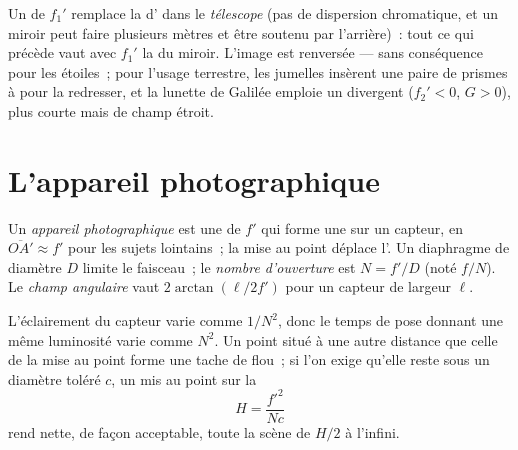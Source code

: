 \begin{remark}\label{rem:b1:optical-instruments:variants}
Un  de  $f_1'$ remplace la 
d' dans le \emph{télescope} (pas de dispersion chromatique, et
un miroir peut faire plusieurs mètres et être soutenu par l'arrière)~:
tout ce qui précède vaut avec $f_1'$ la  du miroir.
L'image est renversée --- sans conséquence pour les étoiles~; pour
l'usage terrestre, les jumelles insèrent une paire de prismes à
 pour la redresser, et la lunette de Galilée emploie un
 divergent ($f_2' < 0$, $G > 0$), plus courte mais de champ
étroit.
\end{remark}

\section{L'appareil photographique}

\begin{definition}\label{def:b1:optical-instruments:camera}
Un \emph{appareil photographique} est une  de
 $f'$ qui forme une  sur un capteur, en
$\overline{OA'} \approx f'$ pour les sujets lointains~; la mise au point
déplace l'. Un diaphragme de diamètre $D$ limite le faisceau~;
le \emph{nombre d'ouverture} est $N = f'/D$ (noté $f/N$). Le
\emph{champ angulaire} vaut $2\arctan(\ell/2f')$ pour un capteur de
largeur $\ell$.
\end{definition}

\begin{proposition}\label{prop:b1:optical-instruments:dof}
L'éclairement du capteur varie comme $1/N^2$, donc le temps de pose
donnant une même luminosité varie comme $N^2$. Un point situé à une
autre distance que celle de la mise au point forme une tache de flou~;
si l'on exige qu'elle reste sous un diamètre toléré $c$, un  mis
au point sur la \emph{}
\[
H = \frac{f'^2}{N c}
\]
rend nette, de façon acceptable, toute la scène de $H/2$ à l'infini.
\end{proposition}

